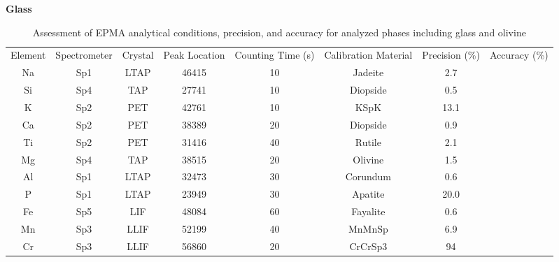 \documentclass[draft]{agujournal2019}
\begin{document}
\begin{table}[!htbp]
\caption[EPMA analytical conditions, precision, and accuracy]{Assessment of EPMA analytical conditions, precision, and accuracy for analyzed phases including glass and olivine}
\label{table:EPMAConditions}

\begin{subtable}[h]{1\textwidth}
\centering
\textbf{Glass} \\ 
\vspace{5pt}
\begin{adjustbox}{width=1\textwidth, center=1\textwidth}
\begin{tabular}{c c c c c c c c}
\hline 
\multirow{3}{*}{Element} & \multirow{3}{*}{Spectrometer} & \multirow{3}{*}{Crystal} & \multirow{3}{*}{Peak Location} & \multirow{3}{2cm}{\centering Counting Time (s)}  & \multirow{3}{2cm}{\centering Calibration Material} & \multirow{3}{*}{Precision (\%)} & \multirow{3}{*}{Accuracy (\%)}\\ 
\\ 
\\
\hline
Na & Sp1 & LTAP & 46415 & 10 & Jadeite & 2.7 &  \\
Si & Sp4 & TAP & 27741 & 10 & Diopside & 0.5 &  \\
K & Sp2 & PET & 42761 & 10 & KSpK & 13.1 &  \\
Ca & Sp2 & PET & 38389 & 20 & Diopside & 0.9 &  \\
Ti & Sp2 & PET & 31416 & 40 & Rutile & 2.1 &  \\
Mg & Sp4 & TAP & 38515 & 20 & Olivine & 1.5 &  \\
Al & Sp1 & LTAP & 32473 & 30 & Corundum & 0.6 &  \\
P & Sp1 & LTAP & 23949 & 30 & Apatite & 20.0 &  \\
Fe & Sp5 & LIF & 48084 & 60 & Fayalite & 0.6 &  \\
Mn & Sp3 & LLIF & 52199 & 40 & MnMnSp & 6.9 &  \\
Cr & Sp3 & LLIF & 56860 & 20 & CrCrSp3 & 94 &  \\
\hline 
\end{tabular}
\end{adjustbox}
\vspace{3pt}
\end{subtable}


\end{table}
\end{document}
